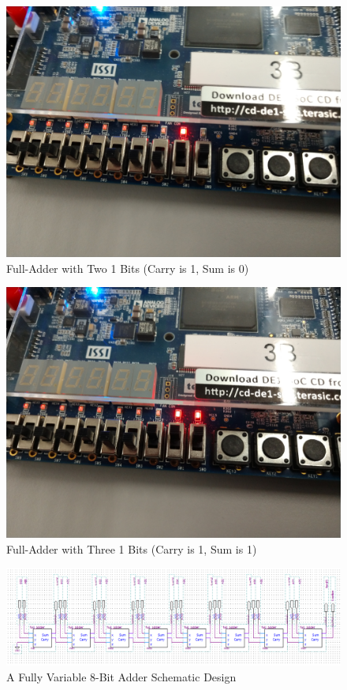 \documentclass[
	letterpaper, %
	10pt, %
]{CSUniSchoolLabReport}
\begin{document}
\begin{figure}[h!]
  \centering
  \includegraphics[width=.9\textwidth]{Figures/FullAdd2.jpg}
  \caption{Full-Adder with Two 1 Bits (Carry is 1, Sum is 0)}
  \label{fig:6}
\end{figure}

\begin{figure}[h!]
  \centering
  \includegraphics[width=.9\textwidth]{Figures/FullAdd3.jpg}
  \caption{Full-Adder with Three 1 Bits (Carry is 1, Sum is 1)}
  \label{fig:7}
\end{figure}

\begin{figure}[h!]
  \centering
  \includegraphics[width=.9\textwidth]{Figures/8BAdderFull.png}
  \caption{A Fully Variable 8-Bit Adder Schematic Design}
  \label{fig:8}
\end{figure}
\end{document}
